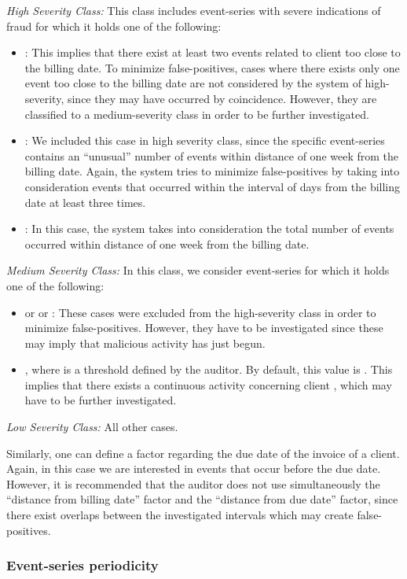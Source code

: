 \documentclass[conference]{IEEEtran}
\begin{document}
\emph{High Severity Class:} This class includes event-series with
severe indications of fraud for which it holds one of the following:
  \begin{itemize}
    \item : This implies that there
    exist at least two events related to client  too close to the
    billing date. To minimize false-positives, cases where there exists only one event too close to
    the billing date are not considered by the system of high-severity, since they
    may have occurred by coincidence. However, they are classified
    to a medium-severity class in order to be further investigated.
    \item : We included this case in high severity class,
    since the specific event-series contains an ``unusual'' number of events within distance of one week from the billing date.
    Again, the system tries to minimize false-positives by taking into consideration events
    that occurred within the interval of  days from the billing date at least three times.
    \item : In this case, the system takes into consideration the total number
    of events occurred within distance of one week from the billing
    date.
  \end{itemize}
\emph{ Medium Severity Class:} In this class, we consider
event-series for which it holds one of the following:
  \begin{itemize}
    \item  or  or : These cases were excluded from the
    high-severity class in order to minimize false-positives. However, they
    have to be investigated since these may imply that malicious activity has just begun.
    \item , where  is a threshold defined by the auditor. By default, this value is . This implies that there exists a continuous activity
    concerning client , which may have to be further investigated.
  \end{itemize}
\emph{Low Severity Class:} All other cases.


Similarly, one can define a factor regarding the due date of the
invoice of a client. Again, in this case we are interested in events
that occur before the due date. However, it is recommended that the
auditor does not use simultaneously the ``distance from billing
date'' factor and the ``distance from due date'' factor, since there
exist overlaps between the investigated intervals which may create
false-positives.

\subsubsection{Event-series periodicity}
\label{subsec:periodicity}
\end{document}

